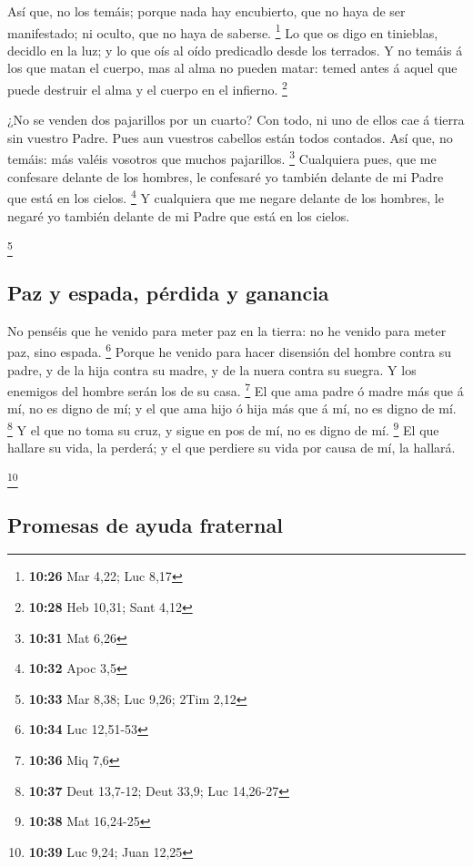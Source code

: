  Así que, no los temáis; porque nada hay encubierto, que no
haya de ser manifestado; ni oculto, que no haya de saberse. \footnote{\textbf{10:26}
  Mar 4,22; Luc 8,17}  Lo que os digo en tinieblas, decidlo
en la luz; y lo que oís al oído predicadlo desde los terrados.
 Y no temáis á los que matan el cuerpo, mas al alma no
pueden matar: temed antes á aquel que puede destruir el alma y el cuerpo
en el infierno. \footnote{\textbf{10:28} Heb 10,31; Sant 4,12}

 ¿No se venden dos pajarillos por un cuarto? Con todo, ni
uno de ellos cae á tierra sin vuestro Padre.  Pues aun
vuestros cabellos están todos contados.  Así que, no
temáis: más valéis vosotros que muchos pajarillos. \footnote{\textbf{10:31}
  Mat 6,26}  Cualquiera pues, que me confesare delante de
los hombres, le confesaré yo también delante de mi Padre que está en los
cielos. \footnote{\textbf{10:32} Apoc 3,5}  Y cualquiera
que me negare delante de los hombres, le negaré yo también delante de mi
Padre que está en los cielos.

\footnote{\textbf{10:33} Mar 8,38; Luc 9,26; 2Tim 2,12}

\hypertarget{paz-y-espada-puxe9rdida-y-ganancia}{%
\subsection{Paz y espada, pérdida y
ganancia}\label{paz-y-espada-puxe9rdida-y-ganancia}}

 No penséis que he venido para meter paz en la tierra: no
he venido para meter paz, sino espada. \footnote{\textbf{10:34} Luc
  12,51-53}  Porque he venido para hacer disensión del
hombre contra su padre, y de la hija contra su madre, y de la nuera
contra su suegra.  Y los enemigos del hombre serán los de
su casa. \footnote{\textbf{10:36} Miq 7,6}  El que ama
padre ó madre más que á mí, no es digno de mí; y el que ama hijo ó hija
más que á mí, no es digno de mí. \footnote{\textbf{10:37} Deut 13,7-12;
  Deut 33,9; Luc 14,26-27}  Y el que no toma su cruz, y
sigue en pos de mí, no es digno de mí. \footnote{\textbf{10:38} Mat
  16,24-25}  El que hallare su vida, la perderá; y el que
perdiere su vida por causa de mí, la hallará.

\footnote{\textbf{10:39} Luc 9,24; Juan 12,25}

\hypertarget{promesas-de-ayuda-fraternal}{%
\subsection{Promesas de ayuda
fraternal}\label{promesas-de-ayuda-fraternal}}

